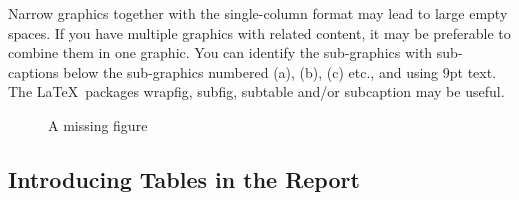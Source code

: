 Narrow graphics together with the single-column format may lead to large empty spaces.
If you have multiple graphics with related content, it may be preferable to combine them in one graphic.
You can identify the sub-graphics with sub-captions below the sub-graphics numbered (a), (b), (c) etc., and using 9pt text.
The \LaTeX\ packages wrapfig, subfig, subtable and/or subcaption may be useful.

\begin{figure}[t!]
\centering
{}
\caption{A missing figure}
\label{fig:AmazingFigure}
\end{figure}

\subsection{Introducing Tables in the Report}


